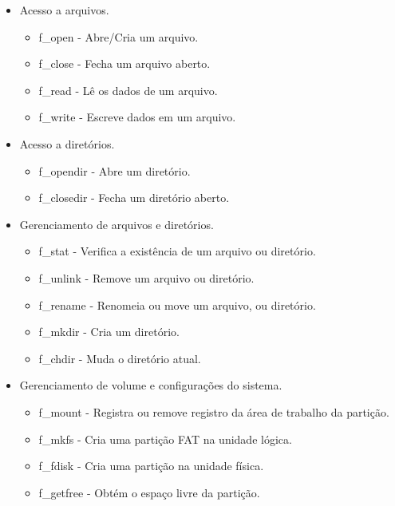 \begin{itemize}
    \item Acesso a arquivos.
    \begin{itemize}
        \item f\_open - Abre/Cria um arquivo.
        \item f\_close - Fecha um arquivo aberto.
        \item f\_read - Lê os dados de um arquivo.
        \item f\_write - Escreve dados em um arquivo.
    \end{itemize}
    \item Acesso a diretórios.
    \begin{itemize}
        \item f\_opendir - Abre um diretório.
        \item f\_closedir - Fecha um diretório aberto.
    \end{itemize}
    \item Gerenciamento de arquivos e diretórios.
    \begin{itemize}
        \item f\_stat - Verifica a existência de um arquivo ou diretório.
        \item f\_unlink - Remove um arquivo ou diretório. 
        \item f\_rename - Renomeia ou move um arquivo, ou diretório.
        \item f\_mkdir - Cria um diretório.
        \item f\_chdir - Muda o diretório atual.
    \end{itemize}
    \item Gerenciamento de volume e configurações do sistema.
    \begin{itemize}
        \item f\_mount - Registra ou remove registro da área de trabalho da partição.
        \item f\_mkfs - Cria uma partição FAT na unidade lógica.
        \item f\_fdisk - Cria uma partição na unidade física.
        \item f\_getfree - Obtém o espaço livre da partição.
    \end{itemize}
\end{itemize}


